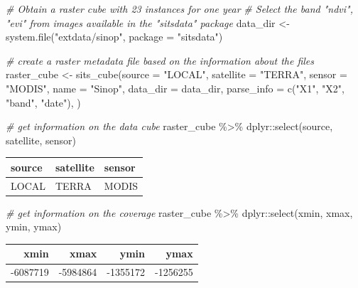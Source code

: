 \documentclass[a4paper,]{tufte-book}
\newenvironment{Shaded}{}{}
\newcommand{\AttributeTok}[1]{\textcolor[rgb]{0.49,0.56,0.16}{#1}}
\newcommand{\CommentTok}[1]{\textcolor[rgb]{0.38,0.63,0.69}{\textit{#1}}}
\newcommand{\FunctionTok}[1]{\textcolor[rgb]{0.02,0.16,0.49}{#1}}
\newcommand{\NormalTok}[1]{#1}
\newcommand{\OtherTok}[1]{\textcolor[rgb]{0.00,0.44,0.13}{#1}}
\newcommand{\SpecialCharTok}[1]{\textcolor[rgb]{0.25,0.44,0.63}{#1}}
\newcommand{\StringTok}[1]{\textcolor[rgb]{0.25,0.44,0.63}{#1}}
\begin{document}
\begin{Shaded}
\begin{Highlighting}[]
\CommentTok{\# Obtain a raster cube with 23 instances for one year}
\CommentTok{\# Select the band "ndvi", "evi" from images available in the "sitsdata" package}
\NormalTok{data\_dir }\OtherTok{\textless{}{-}} \FunctionTok{system.file}\NormalTok{(}\StringTok{"extdata/sinop"}\NormalTok{, }\AttributeTok{package =} \StringTok{"sitsdata"}\NormalTok{)}

\CommentTok{\# create a raster metadata file based on the information about the files}
\NormalTok{raster\_cube }\OtherTok{\textless{}{-}} \FunctionTok{sits\_cube}\NormalTok{(}\AttributeTok{source =} \StringTok{"LOCAL"}\NormalTok{,}
                         \AttributeTok{satellite =} \StringTok{"TERRA"}\NormalTok{,}
                         \AttributeTok{sensor  =} \StringTok{"MODIS"}\NormalTok{,}
                         \AttributeTok{name =} \StringTok{"Sinop"}\NormalTok{,}
                         \AttributeTok{data\_dir =}\NormalTok{ data\_dir,}
                         \AttributeTok{parse\_info =} \FunctionTok{c}\NormalTok{(}\StringTok{"X1"}\NormalTok{, }\StringTok{"X2"}\NormalTok{, }\StringTok{"band"}\NormalTok{, }\StringTok{"date"}\NormalTok{),}
\NormalTok{)}

\CommentTok{\# get information on the data cube }
\NormalTok{raster\_cube }\SpecialCharTok{\%\textgreater{}\%}\NormalTok{ dplyr}\SpecialCharTok{::}\FunctionTok{select}\NormalTok{(source, satellite, sensor)}
\end{Highlighting}
\end{Shaded}

\begin{tabular}{l|l|l}
\hline
source & satellite & sensor\\
\hline
LOCAL & TERRA & MODIS\\
\hline
\end{tabular}

\begin{Shaded}
\begin{Highlighting}[]
\CommentTok{\# get information on the coverage}
\NormalTok{raster\_cube }\SpecialCharTok{\%\textgreater{}\%}\NormalTok{ dplyr}\SpecialCharTok{::}\FunctionTok{select}\NormalTok{(xmin, xmax, ymin, ymax)}
\end{Highlighting}
\end{Shaded}

\begin{tabular}{r|r|r|r}
\hline
xmin & xmax & ymin & ymax\\
\hline
-6087719 & -5984864 & -1355172 & -1256255\\
\hline
\end{tabular}
\end{document}
